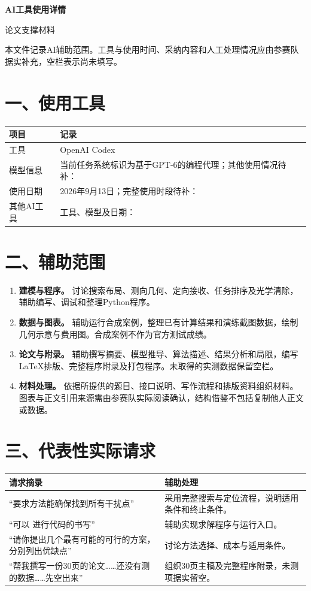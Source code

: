 \documentclass[UTF8,a4paper,12pt,fontset=fandol]{ctexart}
\newcommand{\blank}{\underline{\hspace{3cm}}}
\begin{document}
\begin{center}{\bfseries AI工具使用详情}\par\vspace{8pt}论文支撑材料\end{center}
\noindent 本文件记录AI辅助范围。工具与使用时间、采纳内容和人工处理情况应由参赛队据实补充，空栏表示尚未填写。

\section*{一、使用工具}
\par\noindent\begin{tabularx}{\linewidth}{p{.28\linewidth}Y}\toprule
项目 & 记录\\\midrule
工具 & OpenAI Codex\\
模型信息 & 当前任务系统标识为基于GPT-6的编程代理；其他使用情况待补：\blank\\
使用日期 & 2026年9月13日；完整使用时段待补：\blank\\
其他AI工具 & 工具、模型及日期：\blank\\\bottomrule
\end{tabularx}

\section*{二、辅助范围}
\begin{enumerate}
\item \textbf{建模与程序。} 讨论搜索布局、测向几何、定向接收、任务排序及光学清除，辅助编写、调试和整理Python程序。
\item \textbf{数据与图表。} 辅助运行合成案例，整理已有计算结果和演练截图数据，绘制几何示意与费用图。合成案例不作为官方测试成绩。
\item \textbf{论文与附录。} 辅助撰写摘要、模型推导、算法描述、结果分析和局限，编写LaTeX排版、完整程序附录及打包程序。未取得的实测数据保留空栏。
\item \textbf{材料处理。} 依据所提供的题目、接口说明、写作流程和排版资料组织材料。图表与正文引用来源需由参赛队实际阅读确认，结构借鉴不包括复制他人正文或数据。
\end{enumerate}

\section*{三、代表性实际请求}
\par\noindent\begin{tabularx}{\linewidth}{p{.49\linewidth}Y}\toprule
请求摘录 & 辅助处理\\\midrule
“要求方法能确保找到所有干扰点” & 采用完整搜索与定位流程，说明适用条件和终止条件。\\
“可以 进行代码的书写” & 辅助实现求解程序与运行入口。\\
“请你提出几个最有可能的可行的方案，分别列出优缺点” & 讨论方法选择、成本与适用条件。\\
“帮我撰写一份30页的论文……还没有测的数据……先空出来” & 组织30页主稿及完整程序附录，未测项据实留空。\\\bottomrule
\end{tabularx}
\end{document}
